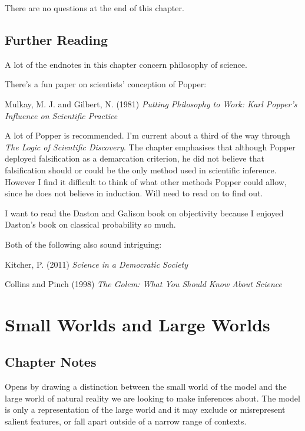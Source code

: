 \documentclass[
]{book}
\begin{document}
There are no questions at the end of this chapter.

\hypertarget{further-reading}{%
\section*{Further Reading}\label{further-reading}}

A lot of the endnotes in this chapter concern philosophy of science.

There's a fun paper on scientists' conception of Popper:

Mulkay, M. J. and Gilbert, N. (1981) \emph{Putting Philosophy to Work: Karl Popper's Influence on Scientific Practice}

A lot of Popper is recommended. I'm current about a third of the way through \emph{The Logic of Scientific Discovery}. The chapter emphasises that although Popper deployed falsification as a demarcation criterion, he did not believe that falsification should or could be the only method used in scientific inference. However I find it difficult to think of what other methods Popper could allow, since he does not believe in induction. Will need to read on to find out.

I want to read the Daston and Galison book on objectivity because I enjoyed Daston's book on classical probability so much.

Both of the following also sound intriguing:

Kitcher, P. (2011) \emph{Science in a Democratic Society}

Collins and Pinch (1998) \emph{The Golem: What You Should Know About Science}

\hypertarget{small_worlds}{%
\chapter{Small Worlds and Large Worlds}\label{small_worlds}}

\hypertarget{chapter-notes-1}{%
\section{Chapter Notes}\label{chapter-notes-1}}

Opens by drawing a distinction between the small world of the model and the large world of natural reality we are looking to make inferences about. The model is only a representation of the large world and it may exclude or misrepresent salient features, or fall apart outside of a narrow range of contexts.
\end{document}

